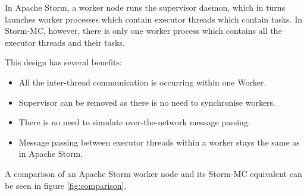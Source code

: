 In Apache Storm, a worker node runs the supervisor daemon, which in turns launches worker processes which contain executor threads which contain tasks. In Storm-MC, however, there is only one worker process which contains all the executor threads and their tasks.

This design has several benefits:

\begin{itemize}
	\item All the inter-thread communication is occurring within one Worker.
	\item Supervisor can be removed as there is no need to synchronise workers.
	\item There is no need to simulate over-the-network message passing.
	\item Message passing between executor threads within a worker stays the same as in Apache Storm.
\end{itemize}

A comparison of an Apache Storm worker node and its Storm-MC equivalent can be seen in figure \ref{fig:comparison}.

